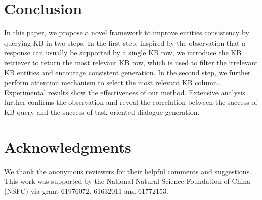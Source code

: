 \documentclass[11pt,a4paper]{article}
\begin{document}
\section{Conclusion}


In this paper, we propose a novel framework to improve entities consistency by querying KB in two steps.
In the first step, inspired by the observation that a response can usually be supported by a single KB row, we introduce the KB retriever to return the most relevant KB row, which is used to filter the irrelevant KB entities and encourage consistent generation.
In the second step, we further perform attention mechanism to select the most relevant KB column.
Experimental results show the effectiveness of our method.
Extensive analysis further confirms the observation
and reveal the correlation between the success of KB query
and the success of task-oriented dialogue generation.

\section*{Acknowledgments}
We thank the anonymous reviewers for their helpful comments and suggestions.
This work was supported by the National Natural Science Foundation of China (NSFC) via grant 61976072, 61632011 and 61772153.




\appendix
\end{document}
